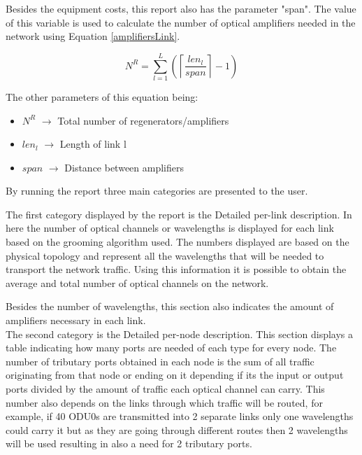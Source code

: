 	Besides the equipment costs, this report also has the parameter "span". The value of this variable is used to calculate the number of optical amplifiers needed in the network using Equation \ref{amplifiersLink}.
	
	\begin{equation}
		N^R = \sum\limits_{l=1}^L\left(\left\lceil\frac{len_l}{span}\right\rceil-1\right)
		\label{amplifiersLink}
	\end{equation}

	The other parameters of this equation being:
	
	\begin{itemize}
		\item{$N^R$			$\rightarrow$ Total number of regenerators/amplifiers}
		\item{$len_l$		$\rightarrow$ Length of link l}
		\item{$span$		$\rightarrow$ Distance between amplifiers}	
	\end{itemize}	
	
	By running the report three main categories are presented to the user.
	
	The first category displayed by the report is the Detailed per-link description. In here the number of optical channels or wavelengths is displayed for each link based on the grooming algorithm used. The numbers displayed are based on the physical topology and represent all the wavelengths that will be needed to transport the network traffic. Using this information it is possible to obtain the average and total number of optical channels on the network.
	
	Besides the number of wavelengths, this section also indicates the amount of amplifiers necessary in each link. \\
	
	The second category is the Detailed per-node description. This section displays a table indicating how many ports are needed of each type for every node. The number of tributary ports obtained in each node is the sum of all traffic originating from that node or ending on it depending if its the input or output ports divided by the amount of traffic each optical channel can carry. This number also depends on the links through which traffic will be routed, for example, if 40 ODU0s are transmitted into 2 separate links only one wavelengths could carry it but as they are going through different routes then 2 wavelengths will be used resulting in also a need for 2 tributary ports.\\
	
